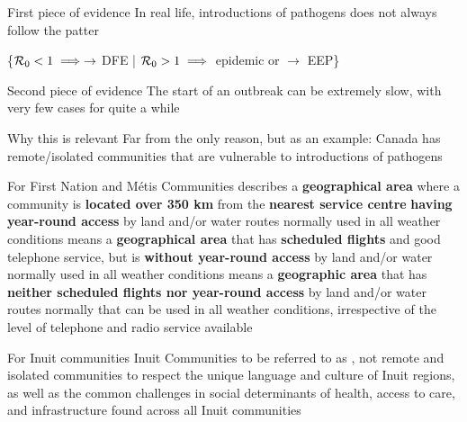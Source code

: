 \documentclass[aspectratio=169]{beamer}
\begin{document}
\begin{frame}{First piece of evidence}
In real life, introductions of pathogens does not always follow the patter
\begin{center}
\{$\mathcal{R}_0<1 \implies \to$ DFE | $\mathcal{R}_0>1 \implies $ epidemic or $\to$ EEP\} 
\end{center}
\end{frame}


\begin{frame}{Second piece of evidence}
The start of an outbreak can be extremely slow, with very few cases for quite a while
\end{frame}


\begin{frame}{Why this is relevant}
Far from the only reason, but as an example: Canada has remote/isolated communities that are vulnerable to introductions of pathogens
\end{frame}


\begin{frame}{For First Nation and Métis Communities}
	 describes a \textbf{geographical area} where a community is \textbf{located over 350 km} from the \textbf{nearest service centre} \textbf{having year-round access} by land and/or water routes normally used in all weather conditions
	\vfill	
	 means a \textbf{geographical area} that has \textbf{scheduled flights} and good telephone service, but is \textbf{without year-round access} by land and/or water normally used in all weather conditions
	\vfill
	 means a \textbf{geographic area} that has \textbf{neither scheduled flights nor year-round access} by land and/or water routes normally that can be used in all weather conditions, irrespective of the level of telephone and radio service available
\end{frame}

\begin{frame}{For Inuit communities}
	Inuit Communities to be referred to as , not remote and isolated communities to respect the unique language and culture of Inuit regions, as well as the common challenges in social determinants of health, access to care, and infrastructure found across all Inuit communities
\end{frame}
\end{document}
